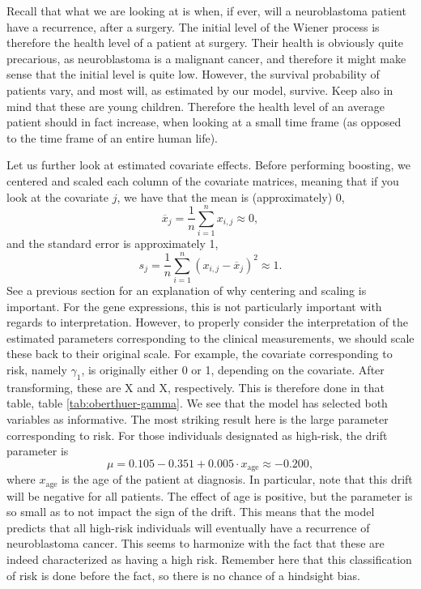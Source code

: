 Recall that what we are looking at is when, if ever, will a neuroblastoma patient have a recurrence, after a surgery.
The initial level of the Wiener process is therefore the health level of a patient at surgery.
Their health is obviously quite precarious, as neuroblastoma is a malignant cancer, and therefore it might make sense that the initial level is quite low.
However, the survival probability of patients vary, and most will, as estimated by our model, survive.
Keep also in mind that these are young children.
Therefore the health level of an average patient should in fact increase, when looking at a small time frame (as opposed to the time frame of an entire human life).

Let us further look at estimated covariate effects.
Before performing boosting, we centered and scaled each column of the covariate matrices, meaning that if you look at the covariate $j$, we have that the mean is (approximately) 0,
\begin{equation}
    \overline{x}_j=\frac{1}{n}\sum_{i=1}^n x_{i,j}\approx 0,
\end{equation}
and the standard error is approximately 1,
\begin{equation}
    s_j=\frac{1}{n}\sum_{i=1}^n (x_{i,j}-\overline{x}_j)^2\approx 1.
\end{equation}
See a previous section for an explanation of why centering and scaling is important.
For the gene expressions, this is not particularly important with regards to interpretation.
However, to properly consider the interpretation of the estimated parameters corresponding to the clinical measurements, we should
scale these back to their original scale.
For example, the covariate corresponding to risk, namely $\gamma_1$, is originally either 0 or 1, depending on the covariate.
After transforming, these are X and X, respectively.
This is therefore done in that table, table \ref{tab:oberthuer-gamma}.
We see that the model has selected both variables as informative.
The most striking result here is the large parameter corresponding to risk.
For those individuals designated as high-risk, the drift parameter is
\begin{equation}
    \mu=0.105-0.351+0.005\cdot x_{\text{age}}\approx-0.200,
\end{equation}
where $x_{\text{age}}$ is the age of the patient at diagnosis.
In particular, note that this drift will be negative for all patients.
The effect of age is positive, but the parameter is so small as to not impact the sign of the drift. 
This means that the model predicts that all high-risk individuals will eventually have a recurrence of neuroblastoma cancer.
This seems to harmonize with the fact that these are indeed characterized as having a high risk.
Remember here that this classification of risk is done before the fact, so there is no chance of a hindsight bias.

